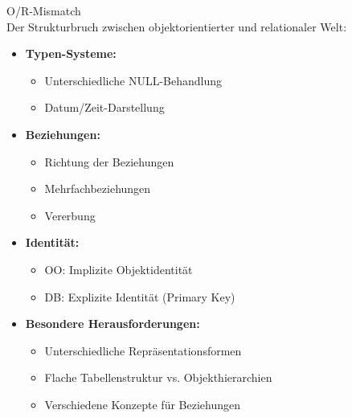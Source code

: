 \begin{definition}{O/R-Mismatch}\\
Der Strukturbruch zwischen objektorientierter und relationaler Welt:
\begin{itemize}
    \item \textbf{Typen-Systeme:}
    \begin{itemize}
        \item Unterschiedliche NULL-Behandlung
        \item Datum/Zeit-Darstellung
    \end{itemize}
    \item \textbf{Beziehungen:}
    \begin{itemize}
        \item Richtung der Beziehungen
        \item Mehrfachbeziehungen
        \item Vererbung
    \end{itemize}
    \item \textbf{Identität:}
    \begin{itemize}
        \item OO: Implizite Objektidentität
        \item DB: Explizite Identität (Primary Key)
    \end{itemize}
    \item \textbf{Besondere Herausforderungen:}
    \begin{itemize}
        \item Unterschiedliche Repräsentationsformen
        \item Flache Tabellenstruktur vs. Objekthierarchien
        \item Verschiedene Konzepte für Beziehungen
    \end{itemize}
\end{itemize}
\end{definition}

